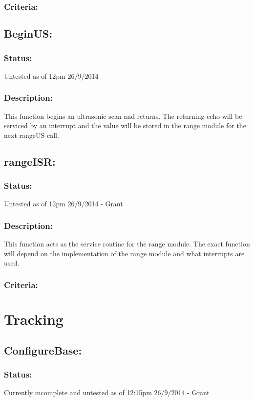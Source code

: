 \documentclass[]{article}
\begin{document}
\subsubsection{Criteria:}

\subsection{BeginUS:}
\subsubsection{Status:}
Untested as of 12pm 26/9/2014

\subsubsection{Description:}
This function begins an ultrasonic scan and returns. The returning echo will be serviced by an interrupt and the value will be stored in the range module for the next rangeUS call.

\subsection{rangeISR:}
\subsubsection{Status:}
Untested as of 12pm 26/9/2014 - Grant

\subsubsection{Description:}
This function acts as the service routine for the range module. The exact function will depend on the implementation of the range module and what interrupts are used.

\subsubsection{Criteria:}

\newpage
\section{Tracking}

\subsection{ConfigureBase:}
\subsubsection{Status:}
Currently incomplete and untested as of 12:15pm 26/9/2014 - Grant
\end{document}

